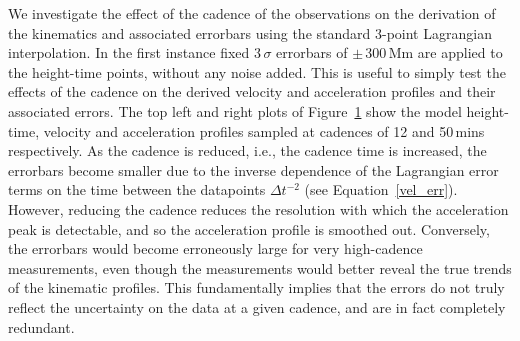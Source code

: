 \documentclass[structabstract]{aa}
\begin{document}
\begin{figure}[t]
\caption{}
\label{fig_cadence_hva}
\end{figure}

We investigate the effect of the cadence of the observations on the derivation of the kinematics and associated errorbars using the standard 3-point Lagrangian interpolation. In the first instance fixed 3\,$\sigma$ errorbars of $\pm$\,300\,Mm are applied to the height-time points, without any noise added. This is useful to simply test the effects of the cadence on the derived velocity and acceleration profiles and their associated errors. The top left and right plots of Figure~\ref{fig_cadence_hva} show the model height-time, velocity and acceleration profiles sampled at cadences of 12 and 50\,mins respectively. As the cadence is reduced, i.e., the cadence time is increased, the errorbars become smaller due to the inverse dependence of the Lagrangian error terms on the time between the datapoints $\Delta t^{-2}$ (see Equation~\ref{vel_err}). However, reducing the cadence reduces the resolution with which the acceleration peak is detectable, and so the acceleration profile is smoothed out. Conversely, the errorbars would become erroneously large for very high-cadence measurements, even though the measurements would better reveal the true trends of the kinematic profiles. This fundamentally implies that the errors do not truly reflect the uncertainty on the data at a given cadence, and are in fact completely redundant.
\end{document}
